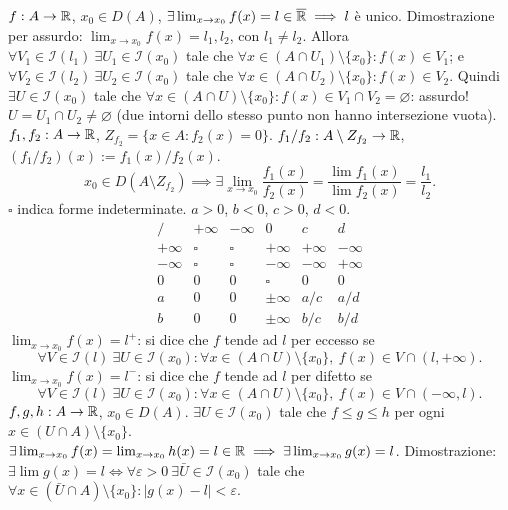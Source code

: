 $f:A\to\mathbb R$, $x_0\in D(A)$, $\exists\lim_{x\to x_0}f(x)=l\in\overline{\mathbb R}\implies l$ è unico.
Dimostrazione per assurdo: $\lim_{x\to x_0}f(x)=l_1,l_2$, con $l_1\ne l_2$.
Allora $\forall V_1\in\mathcal I(l_1)\ \exists U_1\in\mathcal I(x_0)$ tale che $\forall x\in(A\cap U_1)\setminus\{x_0\}:f(x)\in V_1$;
e $\forall V_2\in\mathcal I(l_2)\ \exists U_2\in\mathcal I(x_0)$ tale che $\forall x\in(A\cap U_2)\setminus\{x_0\}:f(x)\in V_2$.
Quindi $\exists U\in\mathcal I(x_0)$ tale che $\forall x\in(A\cap U)\setminus\{x_0\}:f(x)\in V_1\cap V_2=\varnothing$: assurdo!
$U=U_1\cap U_2\ne\varnothing$ (due intorni dello stesso punto non hanno intersezione vuota).
$f_1,f_2:A\to\mathbb R$, $Z_{f_2}=\{x\in A:f_2(x)=0\}$.
$f_1/f_2:A\setminus Z_{f_2}\to\mathbb R$, $(f_1/f_2)(x):=f_1(x)/f_2(x)$.
\[x_0\in D(A\setminus Z_{f_2})\implies\exists\lim_{x\to x_0}\frac{f_1(x)}{f_2(x)}=\frac{\lim f_1(x)}{\lim f_2(x)}=\frac{l_1}{l_2}.\]
$\square$ indica forme indeterminate. $a>0$, $b<0$, $c>0$, $d<0$.
\[\begin{array}{c|rrrrr}/&+\infty&-\infty&0&c&d\\\hline+\infty&\square&\square&+\infty&+\infty&-\infty\\-\infty&\square&\square&-\infty&-\infty&+\infty\\0&0&0&\square&0&0\\a&0&0&\pm\infty&a/c&a/d\\b&0&0&\pm\infty&b/c&b/d\end{array}\]
$\lim_{x\to x_0}f(x)=l^+$: si dice che $f$ tende ad $l$ per eccesso se
\[\forall V\in\mathcal I(l)\ \exists U\in\mathcal I(x_0):\forall x\in(A\cap U)\setminus\{x_0\},\ f(x)\in V\cap(l,+\infty).\]
$\lim_{x\to x_0}f(x)=l^-$: si dice che $f$ tende ad $l$ per difetto se
\[\forall V\in\mathcal I(l)\ \exists U\in\mathcal I(x_0):\forall x\in(A\cap U)\setminus\{x_0\},\ f(x)\in V\cap(-\infty,l).\]
$f,g,h:A\to\mathbb R$, $x_0\in D(A)$.
$\exists U\in\mathcal I(x_0)$ tale che $f\le g\le h$ per ogni $x\in(U\cap A)\setminus\{x_0\}$.
$\exists\lim_{x\to x_0}f(x)=\lim_{x\to x_0}h(x)=l\in\mathbb R\implies\exists\lim_{x\to x_0}g(x)=l$.
Dimostrazione: $\exists\lim g(x)=l\iff\forall\varepsilon>0\ \exists\bar U\in\mathcal I(x_0)$ tale che $\forall x\in(\bar U\cap A)\setminus\{x_0\}:|g(x)-l|<\varepsilon$.
